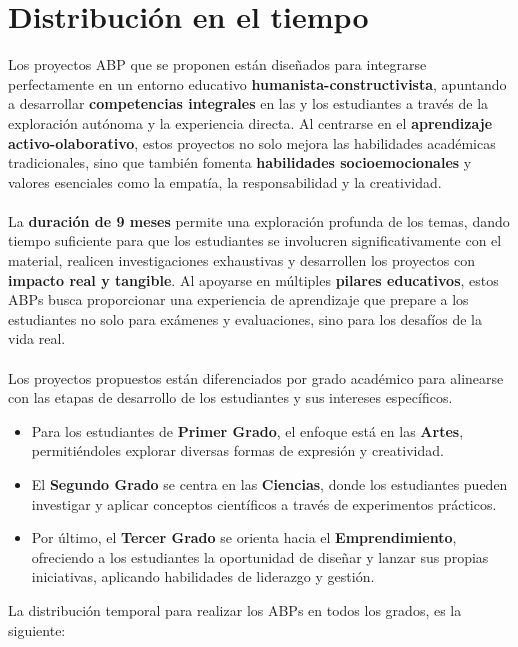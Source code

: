 \section{Distribución en el tiempo }
Los proyectos ABP que se proponen están diseñados para integrarse perfectamente en un entorno educativo \textbf{humanista-constructivista}, apuntando a desarrollar \textbf{competencias integrales} en las y los  estudiantes a través de la exploración autónoma y la experiencia directa. Al centrarse en el \textbf{aprendizaje activo-olaborativo}, estos proyectos no solo mejora las habilidades académicas tradicionales, sino que también fomenta \textbf{habilidades socioemocionales} y valores esenciales como la empatía, la responsabilidad y la creatividad.
\\  \\
La \textbf{duración de 9 meses} permite una exploración profunda de los temas, dando tiempo suficiente para que los estudiantes se involucren significativamente con el material, realicen investigaciones exhaustivas y desarrollen los proyectos con \textbf{impacto real y tangible}. Al apoyarse en múltiples \textbf{pilares educativos}, estos ABPs busca proporcionar una experiencia de aprendizaje que prepare a los estudiantes no solo para exámenes y evaluaciones, sino para los desafíos de la vida real.
\\ \\
Los proyectos propuestos están diferenciados por grado académico para alinearse con las etapas de desarrollo de los estudiantes y sus intereses específicos.
\begin{itemize}
    \item Para los estudiantes de \textbf{Primer Grado}, el enfoque está en las \textbf{Artes}, permitiéndoles explorar diversas formas de expresión y creatividad.
    \item El \textbf{Segundo Grado} se centra en las \textbf{Ciencias}, donde los estudiantes pueden investigar y aplicar conceptos científicos a través de experimentos prácticos.
    \item Por último, el \textbf{Tercer Grado} se orienta hacia el \textbf{Emprendimiento}, ofreciendo a los estudiantes la oportunidad de diseñar y lanzar sus propias iniciativas, aplicando habilidades de liderazgo y gestión.
\end{itemize}
La distribución temporal para realizar los ABPs en todos los grados, es la siguiente:
